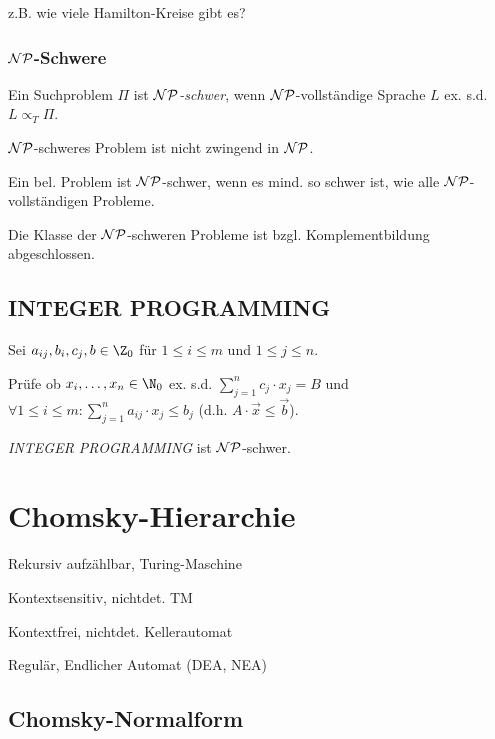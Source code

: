 \spacing

z.B. wie viele Hamilton-Kreise gibt es?

\subsubsection*{$\mathcal{NP}$-Schwere}

Ein Suchproblem $\Pi$ ist \emph{$\mathcal{NP}$-schwer}, wenn $\mathcal{NP}$-vollständige Sprache $L$ ex. s.d. $L \propto_T \Pi$.

$\mathcal{NP}$-schweres Problem ist nicht zwingend in $\mathcal{NP}$.

Ein bel. Problem ist $\mathcal{NP}$-schwer, wenn es mind. so schwer ist, wie alle $\mathcal{NP}$-vollständigen Probleme.

\spacing

Die Klasse der $\mathcal{NP}$-schweren Probleme ist bzgl. Komplementbildung abgeschlossen.

\subsection*{INTEGER PROGRAMMING}

Sei $a_{ij}, b_i, c_j, b \in \Z_0$ für $1 \leq i \leq m$ und $1 \leq j \leq n$.

Prüfe ob $x_i, \dots, x_n \in \N_0$ ex. s.d. $\sum_{j=1}^n c_j \cdot x_j = B$ und $\forall 1 \leq i \leq m : \sum_{j=1}^n a_{ij} \cdot x_j \leq b_j$ (d.h. $A \cdot \vec{x} \leq \vec{b}$).

\emph{INTEGER PROGRAMMING} ist $\mathcal{NP}$-schwer.

\section*{Chomsky-Hierarchie}

\begin{description}[leftmargin=!,labelwidth=8mm]
	\item[Typ 0] Rekursiv aufzählbar, Turing-Maschine
	\item[Typ 1] Kontextsensitiv, nichtdet. TM
	\item[Typ 2] Kontextfrei, nichtdet. Kellerautomat
	\item[Typ 3] Regulär, Endlicher Automat (DEA, NEA)
\end{description}

\subsection*{Chomsky-Normalform}
